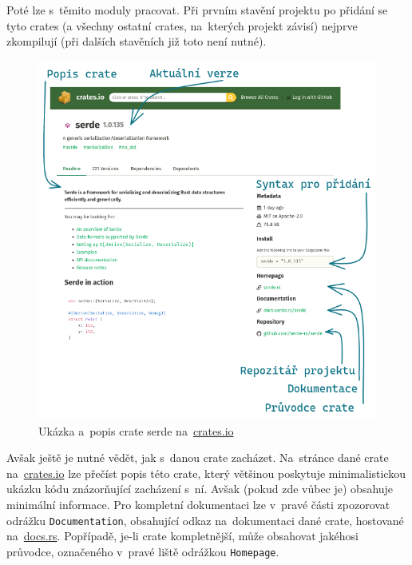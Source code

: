 \documentclass[a4paper, 12pt]{article} %
\begin{document}
            Poté lze s~těmito moduly pracovat. Při prvním stavění projektu po přidání se tyto crates (a všechny ostatní crates, na~kterých projekt závisí) nejprve zkompilují (při dalších stavěních již toto není nutné).
            
            \begin{center}
                \begin{figure}[H]
                    \centering
                    \includegraphics[width=0.95\linewidth]{cratesio}
                    \caption{Ukázka a~popis crate serde na~\href{https://crates.io}{crates.io}}
                    \label{fig:cratesio}
                \end{figure}
            \end{center}
            
            Avšak ještě je nutné vědět, jak s~danou crate zacházet. Na~stránce dané crate na~\href{https://crates.io}{crates.io} lze přečíst popis této crate, který většinou poskytuje minimalistickou ukázku kódu znázorňující zacházení s~ní. Avšak (pokud zde vůbec je) obsahuje minimální informace. Pro kompletní dokumentaci lze v~pravé části zpozorovat odrážku \texttt{Documentation}, obsahující odkaz na~dokumentaci dané crate, hostované na~\href{https://docs.rs/}{docs.rs}. Popřípadě, je-li crate kompletnější, může obsahovat jakéhosi průvodce, označeného v~pravé liště odrážkou \texttt{Homepage}.
\end{document}
